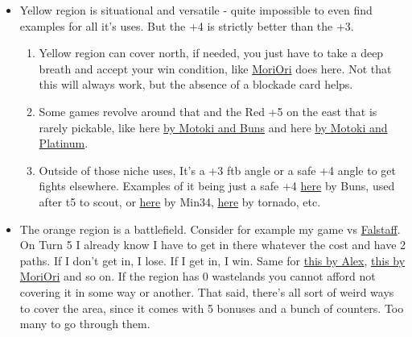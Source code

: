 \begin{itemize}
\begin{enumerate}
        \item The surrounding +3 bonuses can be decent picks by themselves, but for different purposes. Barrens acts as a late counter to the yellow region (for example \href{https://www.warzone.com/MultiPlayer?GameID=33412314}{by Jacob}, or as a safe +3 for future coverage if required \href{https://www.warzone.com/MultiPlayer?GameID=30723351}{by Tornado}). Gooblis (blue +3 on the right), is either an FTB (above examples), or safe +3 to try a counter attempt vs the light blue region.
    \end{enumerate}
    \item Yellow region is situational and versatile - quite impossible to even find examples for all it's uses. But the +4 is strictly better than the +3.
    \begin{enumerate}
        \item Yellow region can cover north, if needed, you just have to take a deep breath and accept your win condition, like \href{https://www.warzone.com/MultiPlayer?GameID=33047568}{MoriOri} does here. Not that this will always work, but the absence of a blockade card helps.
        \item Some games revolve around that and the Red +5 on the east that is rarely pickable, like here \href{https://www.warzone.com/MultiPlayer?GameID=38512647}{by Motoki and Buns} and here \href{https://www.warzone.com/MultiPlayer?GameID=40095730}{by Motoki and Platinum}.
        \item Outside of those niche uses, It's a +3 ftb angle or a safe +4 angle to get fights elsewhere. Examples of it being just a safe +4 \href{https://www.warzone.com/MultiPlayer?GameID=25909919}{here} by Buns, used after t5 to scout, or \href{https://www.warzone.com/MultiPlayer?GameID=41120389}{here} by Min34, \href{https://www.warzone.com/MultiPlayer?GameID=37435229}{here} by tornado, etc. 
    \end{enumerate}
    \item The orange region is a battlefield. Consider for example my game vs \href{https://www.warzone.com/MultiPlayer?GameID=41111396}{Falstaff}. On Turn 5 I already know I have to get in there whatever the cost and have 2 paths. If I don't get in, I lose. If I get in, I win. Same for \href{https://www.warzone.com/MultiPlayer?GameID=32961154}{this by Alex}, \href{https://www.warzone.com/MultiPlayer?GameID=33047568}{this by MoriOri} and so on. If the region has 0 wastelands you cannot afford not covering it in some way or another. That said, there's all sort of weird ways to cover the area, since it comes with 5 bonuses and a bunch of counters. Too many to go through them. 

\end{itemize}
